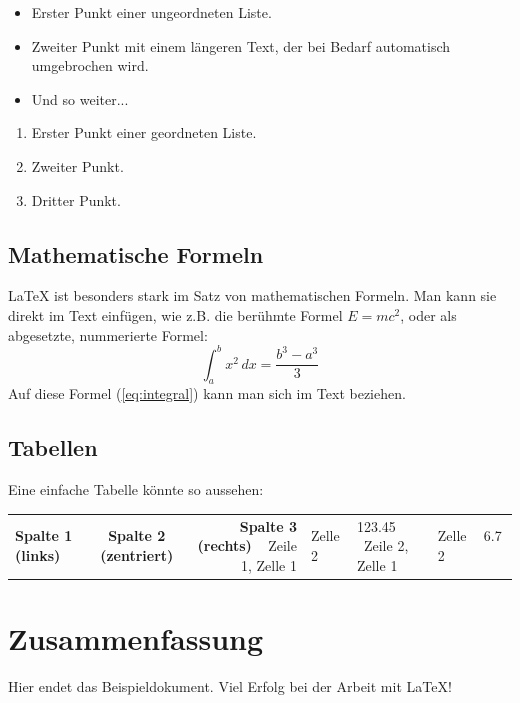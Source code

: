 \documentclass[
    12pt,           %
    a4paper,        %
    oneside         %
]{scrartcl}         %
\begin{document}
\begin{itemize}
    \item Erster Punkt einer ungeordneten Liste.
    \item Zweiter Punkt mit einem längeren Text, der bei Bedarf automatisch umgebrochen wird.
    \item Und so weiter...
\end{itemize}

\begin{enumerate}
    \item Erster Punkt einer geordneten Liste.
    \item Zweiter Punkt.
    \item Dritter Punkt.
\end{enumerate}

\subsection{Mathematische Formeln}
LaTeX ist besonders stark im Satz von mathematischen Formeln. Man kann sie direkt im Text einfügen, wie z.B. die berühmte Formel $E = mc^2$, oder als abgesetzte, nummerierte Formel:
\begin{equation}
    \int_{a}^{b} x^2 \,dx = \frac{b^3 - a^3}{3}
    \label{eq:integral}
\end{equation}
Auf diese Formel (\ref{eq:integral}) kann man sich im Text beziehen.

\subsection{Tabellen}
Eine einfache Tabelle könnte so aussehen:

\begin{center} %
\begin{tabular}{|l|c|r|}
    \hline
    \textbf{Spalte 1 (links)} & \textbf{Spalte 2 (zentriert)} & \textbf{Spalte 3 (rechts)} \
    \hline
    Zeile 1, Zelle 1 & Zelle 2 & 123.45 \
    Zeile 2, Zelle 1 & Zelle 2 & 6.7 \
    \hline
\end{tabular}
\end{center}

\section{Zusammenfassung}
Hier endet das Beispieldokument. Viel Erfolg bei der Arbeit mit LaTeX!
\end{document}
